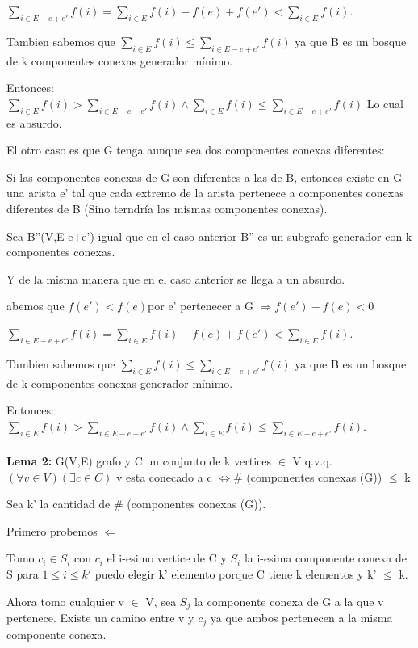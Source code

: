$\sum_{i \in E-e+e'} f(i) = \sum_{i \in E} f(i) - f(e) + f(e') < \sum_{i \in E} f(i)$.

Tambien sabemos que $\sum_{i \in E} f(i) \leq \sum_{i \in E-e+e'} f(i)$ ya que B es un bosque de k componentes conexas generador mínimo.

Entonces: $\sum_{i \in E} f(i) > \sum_{i \in E-e+e'} f(i) \wedge \sum_{i \in E} f(i) \leq \sum_{i \in E-e+e'} f(i)$
Lo cual es absurdo.

El otro caso es que G tenga aunque sea dos componentes conexas diferentes:

Si las componentes conexas de G son diferentes a las de B, entonces existe en G una arista e' tal que cada extremo de la arista pertenece a componentes conexas diferentes de B (Sino terndría las mismas componentes conexas).

Sea B''(V,E-e+e') igual que en el caso anterior B'' es un subgrafo generador con k componentes conexas.

Y de la misma manera que en el caso anterior se llega a un absurdo.

abemos que $f(e') < f(e) $por e' pertenecer a G $\Rightarrow f(e') - f(e) < 0$

$\sum_{i \in E-e+e'} f(i) = \sum_{i \in E} f(i) - f(e) + f(e') < \sum_{i \in E} f(i)$.

Tambien sabemos que $\sum_{i \in E} f(i) \leq \sum_{i \in E-e+e'} f(i)$ ya que B es un bosque de k componentes conexas generador mínimo.

Entonces: $\sum_{i \in E} f(i) > \sum_{i \in E-e+e'} f(i) \wedge \sum_{i \in E} f(i) \leq \sum_{i \in E-e+e'} f(i)$. \\ \\


\textbf{Lema 2:} G(V,E) grafo y C un conjunto de k vertices $\in $ V q.v.q. $(\forall v \in V)(\exists c \in C)$ v esta conecado a c $\Leftrightarrow \#$ (componentes conexas (G)) $\leq$ k

Sea k' la cantidad de $\#$ (componentes conexas (G)).

Primero probemos $\Leftarrow$

Tomo $c_i \in S_i$ con $c_i$ el i-esimo vertice de C y $S_i$ la i-esima componente conexa de S para $1 \leq i \leq k'$ puedo elegir k' elemento porque C tiene k elementos y k' $\leq$ k.

Ahora tomo cualquier v $\in$ V, sea $S_j$ la componente conexa de G a la que v pertenece. Existe un camino entre v y $c_j$ ya que ambos pertenecen a la misma componente conexa.

